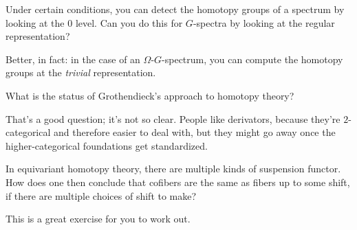 \begin{ques}
Under certain conditions, you can detect the homotopy groups of a spectrum by looking at the $0$ level. Can you do
this for $G$-spectra by looking at the regular representation?
\end{ques}
Better, in fact: in the case of an $\Omega$-$G$-spectrum, you can compute the homotopy groups at the
\emph{trivial} representation.
\begin{ques}
What is the status of Grothendieck's approach to homotopy theory?
\end{ques}
That's a good question; it's not so clear. People like derivators, because they're $2$-categorical and therefore
easier to deal with, but they might go away once the higher-categorical foundations get standardized.
\begin{ques}
In equivariant homotopy theory, there are multiple kinds of suspension functor. How does one then conclude that
cofibers are the same as fibers up to some shift, if there are multiple choices of shift to make?
\end{ques}
This is a great exercise for you to work out.


